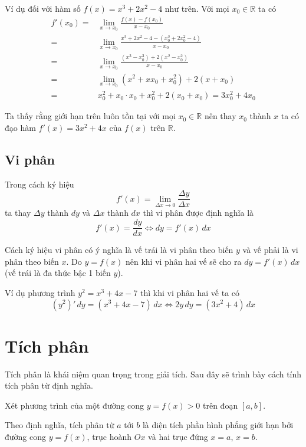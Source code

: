 Ví dụ đối với hàm số $f(x) = x^3 + 2x^2 - 4$ như trên. Với mọi $x_0 \in \mathbb{R}$ ta có
\begin{align*}
	f'(x_0) = & \lim_{x \to x_0} \frac{f(x) - f(x_0)}{x - x_0} \\ = & \lim_{x \to x_0} \frac{x^3 + 2x^2 - 4 - (x_0^3 + 2x_0^2 - 4)}{x - x_0} \\ = & \lim_{x \to x_0} \frac{(x^3 - x_0^3) + 2 (x^2 - x_0^2)}{x - x_0} \\ = & \lim_{x \to x_0} (x^2 + x x_0 + x_0^2) + 2 (x + x_0) \\ = & x_0^2 + x_0 \cdot x_0 + x_0^2 + 2 (x_0 + x_0) = 3x_0^2 + 4 x_0
\end{align*}

Ta thấy rằng giới hạn trên luôn tồn tại với mọi $x_0 \in \mathbb{R}$ nên thay $x_0$ thành $x$ ta có đạo hàm $f'(x) = 3x^2 + 4x$ của $f(x)$ trên $\mathbb{R}$.

\subsection{Vi phân}

Trong cách ký hiệu \[f'(x) = \lim_{\Delta x \to 0} \frac{\Delta y}{\Delta x}\] ta thay $\Delta y$ thành $dy$ và $\Delta x$ thành $dx$ thì vi phân được định nghĩa là 
\begin{equation}
	f'(x) = \frac{dy}{dx} \Leftrightarrow dy = f'(x)\, dx
\end{equation}

Cách ký hiệu vi phân có ý nghĩa là vế trái là vi phân theo biến $y$ và vế phải là vi phân theo biến $x$. Do $y = f(x)$ nên khi vi phân hai vế sẽ cho ra $dy = f'(x)\, dx$ (vế trái là đa thức bậc 1 biến $y$).

Ví dụ phương trình $y^2 = x^3 + 4x - 7$ thì khi vi phân hai vế ta có \[(y^2)' \, dy = (x^3 + 4x - 7) \, dx \Leftrightarrow 2y \, dy = (3x^2 + 4) \, dx\]

\section{Tích phân}

Tích phân là khái niệm quan trọng trong giải tích. Sau đây sẽ trình bày cách tính tích phân từ định nghĩa.

Xét phương trình của một đường cong $y = f(x) > 0$ trên đoạn $[a, b]$.

Theo định nghĩa, tích phân từ $a$ tới $b$ là diện tích phần hình phẳng giới hạn bởi đường cong $y = f(x)$, trục hoành $Ox$ và hai trục đứng $x = a$, $x = b$.


